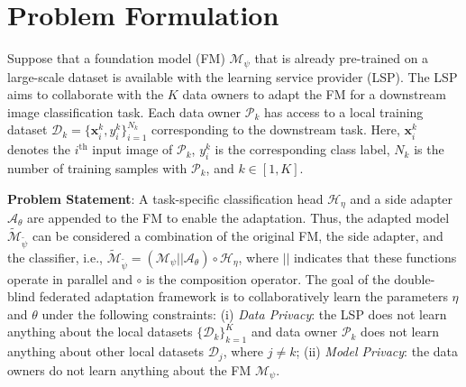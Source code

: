 \section{Problem Formulation}
\label{section: problem-formulation} 

Suppose that a foundation model (FM) $\mathcal{M}_{\psi}$ that is already pre-trained on a large-scale dataset is available with the learning service provider (LSP). The LSP aims to collaborate with the $K$ data owners to adapt the FM for a downstream image classification task. Each data owner $\mathcal{P}_k$ has access to a local training dataset $\mathcal{D}_k = \{\mathbf{x}_i^k,y_i^k\}_{i=1}^{N_k}$ corresponding to the downstream task. Here, $\mathbf{x}_i^k$ denotes the $i^{\text{th}}$ input image of $\mathcal{P}_k$, $y_i^k$ is the corresponding class label, $N_k$ is the number of training samples with $\mathcal{P}_k$, and $k \in [1,K]$. 

\noindent \textbf{Problem Statement}: A task-specific classification head $\mathcal{H}_{\eta}$ and a side adapter $\mathcal{A}_{\theta}$ are appended to the FM to enable the adaptation. Thus, the adapted model $\widetilde{\mathcal{M}}_{\widetilde{\psi}}$ can be considered a combination of the original FM, the side adapter, and the classifier, i.e., $\widetilde{\mathcal{M}}_{\widetilde{\psi}} = (\mathcal{M}_{\psi} || \mathcal{A}_{\theta}) \circ \mathcal{H}_{\eta}$, where $||$ indicates that these functions operate in parallel and $\circ$ is the composition operator. The goal of the double-blind federated adaptation framework is to collaboratively learn the parameters $\eta$ and $\theta$ under the following constraints: (i) \textit{Data Privacy}: the LSP does not learn anything about the local datasets $\{\mathcal{D}_k\}_{k=1}^{K}$ and data owner $\mathcal{P}_k$ does not learn anything about other local datasets $\mathcal{D}_j$, where $j \neq k$; (ii) \textit{Model Privacy}: the data owners do not learn anything about the FM $\mathcal{M}_{\psi}$.

